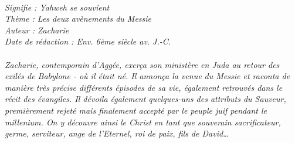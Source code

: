 \BFont
\noindent\hrulefill
\textit{
\bigskip
{\centering{}
\\Signifie : Yahweh se souvient
\\Thème : Les deux avènements du Messie
\\Auteur : Zacharie
\\Date de rédaction : Env. 6ème siècle av. J.-C.\\}
}
\textit{
\\Zacharie, contemporain d’Aggée, exerça son ministère en Juda au retour des exilés de Babylone - où il était né. Il annonça la venue du Messie et raconta de manière très précise différents épisodes de sa vie, également retrouvés dans le récit des évangiles. Il dévoila également quelques-uns des attributs du Sauveur, premièrement rejeté mais finalement accepté par le peuple juif pendant le millenium. On y découvre ainsi le Christ en tant que souverain sacrificateur, germe, serviteur, ange de l’Eternel, roi de paix, fils de David…\bigskip
}
\par\nobreak\noindent\hrulefill

